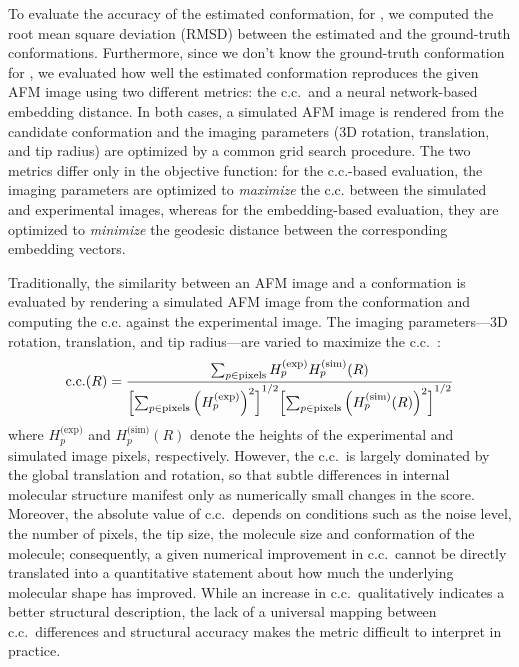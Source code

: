 To evaluate the accuracy of the estimated conformation, for \AK, we computed the root mean square deviation (RMSD) between the estimated and the ground-truth conformations. 
Furthermore, since we don't know the ground-truth conformation for \flhac, we evaluated how well the estimated conformation reproduces the given AFM image using two different metrics: 
the c.c.\ and a neural network-based embedding distance.
In both cases, a simulated AFM image is rendered from the candidate conformation and the imaging parameters (3D rotation, translation, and tip radius) are optimized by a common grid search procedure.
The two metrics differ only in the objective function: for the c.c.-based evaluation, the imaging parameters are optimized to \emph{maximize} the c.c. between the simulated and experimental images, 
whereas for the embedding-based evaluation, they are optimized to \emph{minimize} the geodesic distance between the corresponding embedding vectors.

Traditionally, the similarity between an AFM image and a conformation is evaluated by rendering a simulated AFM image from the conformation 
and computing the c.c. against the experimental image. 
The imaging parameters---3D rotation, translation, and tip radius---are varied to maximize the c.c.\ \cite{Niina2020}: 
\begin{equation}
    \mathrm{c.c.}(R)=
    \frac{\sum_{p \in \text{pixels}} H^{\text{(exp)}}_p H^{\text{(sim)}}_p(R)}
         {{\Bigl[ \sum_{p \in \text{pixels}} \left(H^{\text{(exp)}}_p\right)^2 \Bigr]}^{1/2}
          {\Bigl[ \sum_{p \in \text{pixels}} \left(H^{\text{(sim)}}_p(R)\right)^2 \Bigr]}^{1/2}}
    \label{eq:cc}
\end{equation}
where $H^{\text{(exp)}}_p$ and $H^{\text{(sim)}}_p(R)$ denote the heights of the experimental and simulated image pixels, respectively. 
However, the c.c.\ is largely dominated by the global translation and rotation,
so that subtle differences in internal molecular structure manifest only as numerically small changes in the score.
Moreover, the absolute value of c.c.\ depends on conditions such as the noise level, the number of pixels, the tip size, the molecule size and conformation of the molecule;
consequently, a given numerical improvement in c.c.\ cannot be directly translated into a quantitative statement about how much the underlying molecular shape has improved.
While an increase in c.c.\ qualitatively indicates a better structural description, the lack of a universal mapping between c.c.\ differences and structural accuracy makes the metric difficult to interpret in practice.

